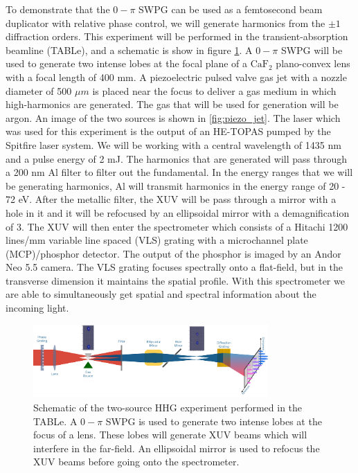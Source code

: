 To demonstrate that the $0-\pi$ SWPG can be used as a femtosecond beam duplicator with relative phase control, we will generate harmonics from the $\pm1$ diffraction orders.  This experiment will be performed in the transient-absorption beamline (TABLe), and a schematic is show in figure \ref{fig:schematic}.  A $0-\pi$ SWPG will be used to generate two intense lobes at the focal plane of a $\mathrm{CaF}_2$ plano-convex lens with a focal length of 400 mm.  A piezoelectric pulsed valve gas jet with a nozzle diameter of 500 $\mu m$ is placed near the focus to deliver a gas medium in which high-harmonics are generated.  The gas that will be used for generation will be argon.  An image of the two sources is shown in \ref{fig:piezo_jet}.  The laser which was used for this experiment is the output of an HE-TOPAS pumped by the Spitfire laser system.  We will be working with a central wavelength of 1435 nm and a pulse energy of 2 mJ.  The harmonics that are generated will pass through a 200 nm Al filter to filter out the fundamental. In the energy ranges that we will be generating harmonics, Al will transmit harmonics in the energy range of 20 - 72 eV.  After the metallic filter, the XUV will be pass through a mirror with a hole in it and it will be refocused by an ellipsoidal mirror with a demagnification of 3.  The XUV will then enter the spectrometer which consists of a Hitachi 1200 lines/mm variable line spaced (VLS) grating with a microchannel plate (MCP)/phosphor detector.  The output of the phosphor is imaged by an Andor Neo 5.5 camera.  The VLS grating focuses spectrally onto a flat-field, but in the transverse dimension it maintains the spatial profile. With this spectrometer we are able to simultaneously get spatial and spectral information about the incoming light.
\begin{figure}
	\centering
	\includegraphics[width=0.8\textwidth]{figures/Two_source/schematic_table.png}
	\caption[Schematic of two-source HHG]{Schematic of the two-source HHG experiment performed in the TABLe. A $0-\pi$ SWPG is used to generate two intense lobes at the focus of a lens.  These lobes will generate XUV beams which will interfere in the far-field.  An ellipsoidal mirror is used to refocus the XUV beams before going onto the spectrometer.}
	\label{fig:schematic}
\end{figure}

